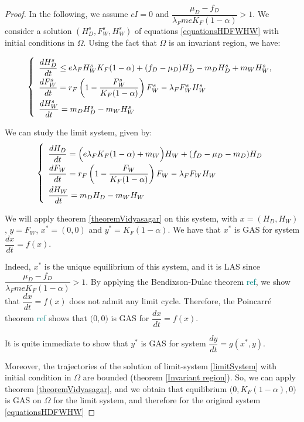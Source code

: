 \documentclass{article}
\newcommand{\lfw}{\lambda_{F}}
\newcommand{\lfw}{\lambda_{F}}
\newcommand{\marc}[1]{\textcolor{teal}{#1}}
\begin{document}
\begin{proof}
In the following, we assume $cI = 0$ and $\dfrac{\mu_D - f_D}{\lfw m e K_F(1-\alpha)} >1$. We consider a solution $(H_D^s, F_W^s, H_W^s)$ of equations \eqref{equationsHDFWHW} with initial conditions in $\Omega$. Using the fact that $\Omega$ is an invariant region, we have:

\begin{equation}
\def\arraystretch{2}
\left\{ \begin{array}{l}
\dfrac{dH^s_D}{dt} \leq e\lfw H^s_W K_F(1-\alpha) + (f_D - \mu_D) H^s_D - m_D H^s_D + m_W H^s_W , \\
\dfrac{dF^s_W}{dt} = r_F \left(1 - \dfrac{F^s_W}{K_F(1-\alpha)} \right) F^s_W - \lfw F^s_W H^s_W \\
\dfrac{dH^s_W}{dt}= m_D H^s_D - m_W H^s_W 
\end{array} \right.
\end{equation}

We can study the limit system, given by:
\begin{equation}
\def\arraystretch{2}
\left\{ \begin{array}{l}
\dfrac{dH_D}{dt} = \Big(e\lfw K_F(1-\alpha) + m_W\Big)H_W + (f_D - \mu_D - m_D) H_D \\
\dfrac{dF_W}{dt} = r_F \left(1 - \dfrac{F_W}{K_F(1-\alpha)} \right) F_W - \lfw F_W H_W \\
\dfrac{dH_W}{dt}= m_D H_D - m_W H_W 
\end{array} \right.
\label{limitSystem}
\end{equation}

We will apply theorem \ref{theoremVidyasagar} on this system, with $x = (H_D, H_W)$, $y = F_W$, $x^* = (0,0)$ and $y^* = K_F(1- \alpha)$. We have that $x^*$ is GAS for system $\dfrac{dx}{dt} = f(x)$. 

Indeed, $x^*$ is the unique equilibrium of this system, and it is LAS since $\dfrac{\mu_D - f_D}{\lfw m e K_F(1-\alpha)} >1$. By applying the Bendixson-Dulac theorem \marc{ref}, we show that $\dfrac{dx}{dt} = f(x)$ does not admit any limit cycle. Therefore, the Poincarré theorem \marc{ref} shows that $\Big(0, 0\Big)$ is GAS for $\dfrac{dx}{dt} = f(x)$.

It is quite immediate to show that $y^*$ is GAS for system $\dfrac{dy}{dt} = g(x^*, y)$. 

Moreover, the trajectories of the solution of limit-system \eqref{limitSystem} with initial condition in $\Omega$ are bounded (theorem \ref{Invariant region}). So, we can apply theorem \ref{theoremVidyasagar}, and we obtain that equilibrium $\Big(0, K_F(1-\alpha), 0)$ is GAS on $\Omega$ for the limit system, and therefore for the original system \eqref{equationsHDFWHW}
\end{proof}
\end{document}
